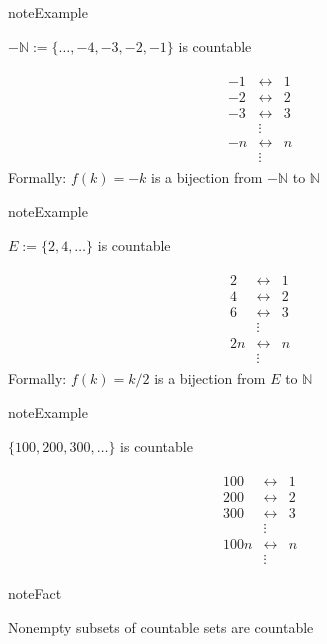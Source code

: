 \documentclass[letterpaper,10pt,english]{jupyterBook}
\begin{document}
\begin{sphinxadmonition}{note}{Example}

\sphinxAtStartPar
\(-\mathbb{N} := \{\ldots, -4, -3, -2, -1\}\) is countable
\end{sphinxadmonition}
\begin{equation*}
\begin{split}
\begin{array}{ccc}
-1 & \leftrightarrow & 1 \\
-2 & \leftrightarrow & 2 \\
-3 & \leftrightarrow & 3 \\
& \vdots &  \\
-n & \leftrightarrow & n \\
& \vdots &  
\end{array}
\end{split}
\end{equation*}
\sphinxAtStartPar
Formally: \(f(k) = -k\) is a bijection from \(-\mathbb{N}\) to \(\mathbb{N}\)

\begin{sphinxadmonition}{note}{Example}

\sphinxAtStartPar
\(E := \{2, 4, \ldots\}\) is countable
\end{sphinxadmonition}
\begin{equation*}
\begin{split}
\begin{array}{ccc}
2 & \leftrightarrow & 1 \\
4 & \leftrightarrow & 2 \\
6 & \leftrightarrow & 3 \\
& \vdots &  \\
2n & \leftrightarrow & n \\
& \vdots &  
\end{array}
\end{split}
\end{equation*}
\sphinxAtStartPar
Formally: \(f(k) = k/2\) is a bijection from \(E\) to \(\mathbb{N}\)

\begin{sphinxadmonition}{note}{Example}

\sphinxAtStartPar
\(\{100, 200, 300, \ldots\}\) is countable
\end{sphinxadmonition}
\begin{equation*}
\begin{split}
\begin{array}{ccc}
100 & \leftrightarrow & 1 \\
200 & \leftrightarrow & 2 \\
300 & \leftrightarrow & 3 \\
& \vdots &  \\
100n & \leftrightarrow & n \\
& \vdots &  
\end{array}
\end{split}
\end{equation*}
\begin{sphinxadmonition}{note}{Fact}

\sphinxAtStartPar
Nonempty subsets of countable sets are countable
\end{sphinxadmonition}
\end{document}
